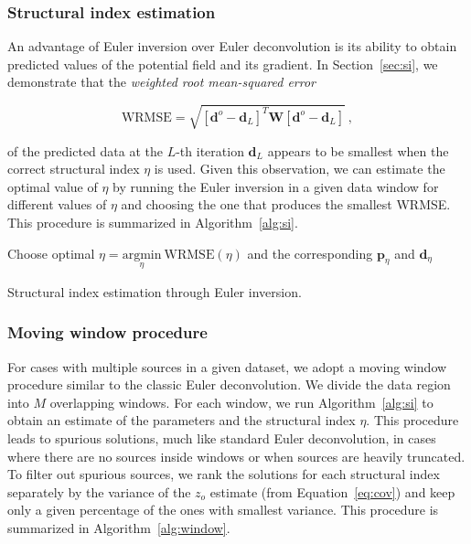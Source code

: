 \subsubsection{Structural index estimation}

An advantage of Euler inversion over Euler deconvolution is its ability to obtain
predicted values of the potential field and its gradient.
In Section~\ref{sec:si}, we demonstrate that the \textit{weighted root
mean-squared error}

\begin{equation}
    \text{WRMSE} = \sqrt{\left[\mathbf{d}^o - \mathbf{d}_L\right]^T\mathbf{W}\left[\mathbf{d}^o - \mathbf{d}_L\right]} \ ,
    \label{eq:wrmse}
\end{equation}

\noindent
of the predicted data at the $L$-th iteration $\mathbf{d}_L$
appears to be smallest when the correct structural index $\eta$ is used.
Given this observation, we can estimate the optimal value of $\eta$ by running
the Euler inversion in a given data window for different values of $\eta$ and
choosing the one that produces the smallest WRMSE.
This procedure is summarized in Algorithm~\ref{alg:si}.

\begin{algorithm}[!h]
  Choose optimal $\eta = \underset{\eta}{\text{argmin}}\ \text{WRMSE}(\eta)$ and the corresponding
  $\mathbf{p}_{\eta}$ and $\mathbf{d}_{\eta}$
  \;
  \BlankLine
  \caption{Structural index estimation through Euler inversion.}
  \label{alg:si}
\end{algorithm}

\subsubsection{Moving window procedure}

For cases with multiple sources in a given dataset, we adopt a moving window
procedure similar to the classic Euler deconvolution.
We divide the data region into $M$ overlapping windows.
For each window, we run Algorithm~\ref{alg:si} to obtain an estimate of the
parameters and the structural index $\eta$.
This procedure leads to spurious solutions, much like standard Euler
deconvolution, in cases where there are no sources inside windows or when
sources are heavily truncated.
To filter out spurious sources, we rank the solutions for each structural index
separately by the variance of the $z_o$ estimate (from Equation~\ref{eq:cov})
and keep only a given percentage of the ones with smallest variance.
This procedure is summarized in Algorithm~\ref{alg:window}.


